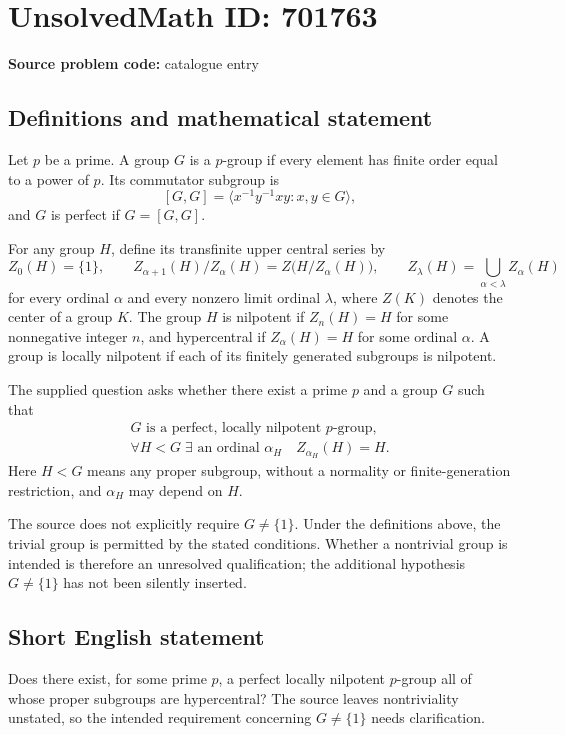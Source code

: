 \documentclass[11pt]{article}
\begin{document}
\section*{UnsolvedMath ID: 701763}
\textbf{Source problem code:} catalogue entry
\subsection{Definitions and mathematical statement}
Let \(p\) be a prime. A group \(G\) is a \(p\)-group if every element has finite order equal to a power of \(p\). Its commutator subgroup is
\[
[G,G]=\langle x^{-1}y^{-1}xy:x,y\in G\rangle,
\]
and \(G\) is perfect if \(G=[G,G]\).

For any group \(H\), define its transfinite upper central series by
\[
Z_0(H)=\{1\},\qquad
Z_{\alpha+1}(H)/Z_\alpha(H)=Z\bigl(H/Z_\alpha(H)\bigr),\qquad
Z_\lambda(H)=\bigcup_{\alpha<\lambda}Z_\alpha(H)
\]
for every ordinal \(\alpha\) and every nonzero limit ordinal \(\lambda\), where \(Z(K)\) denotes the center of a group \(K\). The group \(H\) is nilpotent if \(Z_n(H)=H\) for some nonnegative integer \(n\), and hypercentral if \(Z_\alpha(H)=H\) for some ordinal \(\alpha\). A group is locally nilpotent if each of its finitely generated subgroups is nilpotent.

The supplied question asks whether there exist a prime \(p\) and a group \(G\) such that
\[
\begin{gathered}
G\text{ is a perfect, locally nilpotent }p\text{-group},\\
\forall H<G\;\exists\text{ an ordinal }\alpha_H\quad Z_{\alpha_H}(H)=H.
\end{gathered}
\]
Here \(H<G\) means any proper subgroup, without a normality or finite-generation restriction, and \(\alpha_H\) may depend on \(H\).

The source does not explicitly require \(G\ne\{1\}\). Under the definitions above, the trivial group is permitted by the stated conditions. Whether a nontrivial group is intended is therefore an unresolved qualification; the additional hypothesis \(G\ne\{1\}\) has not been silently inserted.
\subsection{Short English statement}
Does there exist, for some prime \(p\), a perfect locally nilpotent \(p\)-group all of whose proper subgroups are hypercentral? The source leaves nontriviality unstated, so the intended requirement concerning \(G\ne\{1\}\) needs clarification.
\end{document}
